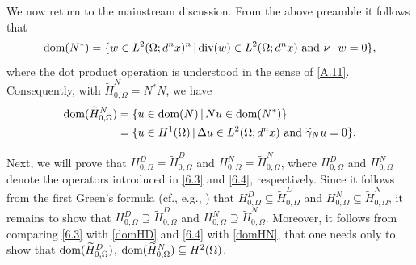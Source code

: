 \documentclass[reqno,10pt, centertags]{amsart}
\newcommand{\no}{\nonumber}
\newcommand{\lb}{\label}
\newcommand{\wti}{\widetilde}
\newcommand{\Om}{\Omega}
\newcommand{\dom}{\text{\rm{dom}}}
\numberwithin{equation}{section}
\theoremstyle{definition}
\begin{document}
We now return to the mainstream discussion.
From the above preamble it follows that
\begin{equation}
\dom(N^*)=\{w\in L^2(\Omega;d^nx)^n\,|\,{\rm div}(w)\in
L^2(\Omega;d^nx) \mbox{ and }\nu\cdot w=0\}, 
\end{equation}
where the dot product operation is understood in the sense of \eqref{A.11}.
Consequently, with $\wti H_{0,\Om}^N=N^*N$, we have
\begin{align}
\dom(\wti H_{0,\Om}^N) & = \{u\in\dom(N) \,|\,Nu\in\dom(N^*)\} \no
\\
& =\{u\in H^{1}(\Om) \,|\, \Delta u\in L^{2}(\Om;d^nx)\mbox{ and }
\wti\gamma_N u=0\}.
\lb{domHN}
\end{align}

Next, we will prove that $H_{0,\Om}^D = \wti H_{0,\Om}^D$ and
$H_{0,\Om}^N = \wti H_{0,\Om}^N$, where $H_{0,\Om}^D$ and
$H_{0,\Om}^N$ denote the operators introduced in \eqref{6.3} and
\eqref{6.4}, respectively. Since it follows from the first Green's
formula (cf., e.g., \cite[Theorem 4.4]{Mc00}) that $H_{0,\Om}^D \subseteq
\wti H_{0,\Om}^D$ and $H_{0,\Om}^N \subseteq \wti H_{0,\Om}^N$, it
remains to show that $H_{0,\Om}^D \supseteq \wti H_{0,\Om}^D$ and
$H_{0,\Om}^N \supseteq \wti H_{0,\Om}^N$. Moreover, it follows from
comparing \eqref{6.3} with \eqref{domHD} and \eqref{6.4} with
\eqref{domHN}, that one needs only to show that $\dom(\wti
H_{0,\Om}^D)$, $\dom(\wti H_{0,\Om}^N)\subseteq H^{2}(\Omega)$.
\end{document}
